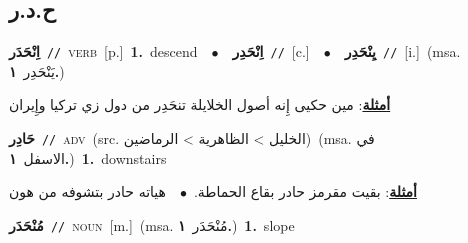 \documentclass[10pt,a4paper,twoside]{article} %
\begin{document}
\begin{multicols}{2}
\vspace{-3mm}
\subsection*{\color{blue}\foreignlanguage{arabic}{ح.د.ر}\color{blue}{}} 

{\setlength\topsep{0pt}\textbf{\foreignlanguage{arabic}{اِنْحَدَر}}\ {\color{gray}\texttt{//}\color{black}}\ \textsc{verb}\ [p.]\ \textbf{1.}~descend\ \ $\bullet$\ \ \setlength\topsep{0pt}\textbf{\foreignlanguage{arabic}{اِنْحَدِر}}\ {\color{gray}\texttt{//}\color{black}}\ [c.]\ \ $\bullet$\ \ \setlength\topsep{0pt}\textbf{\foreignlanguage{arabic}{يِنْحَدِر}}\ {\color{gray}\texttt{//}\color{black}}\ [i.]\ \color{gray}(msa. \foreignlanguage{arabic}{يَنْحَدِر}~\foreignlanguage{arabic}{\textbf{١.}})\color{black}\  \begin{flushright}\color{gray}\foreignlanguage{arabic}{\textbf{\underline{\foreignlanguage{arabic}{أمثلة}}}: مين حكيى إِنه أصول الخلايلة تنحَدِر من دول زي تركيا وإِيران}\end{flushright}\color{black}} \vspace{2mm}

{\setlength\topsep{0pt}\textbf{\foreignlanguage{arabic}{حَادِر}}\ {\color{gray}\texttt{//}\color{black}}\ \textsc{adv}\ (src. \color{gray}\foreignlanguage{arabic}{الخليل > الظاهرية > الرماضين}\color{black})\ \color{gray}(msa. \foreignlanguage{arabic}{في الاسفل}~\foreignlanguage{arabic}{\textbf{١.}})\color{black}\ \textbf{1.}~downstairs\  \begin{flushright}\color{gray}\foreignlanguage{arabic}{\textbf{\underline{\foreignlanguage{arabic}{أمثلة}}}: بقيت مقرمز حادر بقاع الحماطة.\ $\bullet$\ \  هياته حادر بتشوفه من هون}\end{flushright}\color{black}} \vspace{2mm}

{\setlength\topsep{0pt}\textbf{\foreignlanguage{arabic}{مُنْحَدَر}}\ {\color{gray}\texttt{//}\color{black}}\ \textsc{noun}\ [m.]\ \color{gray}(msa. \foreignlanguage{arabic}{مُنْحَدَر}~\foreignlanguage{arabic}{\textbf{١.}})\color{black}\ \textbf{1.}~slope\ } \vspace{2mm}


\end{multicols}
\end{document}
